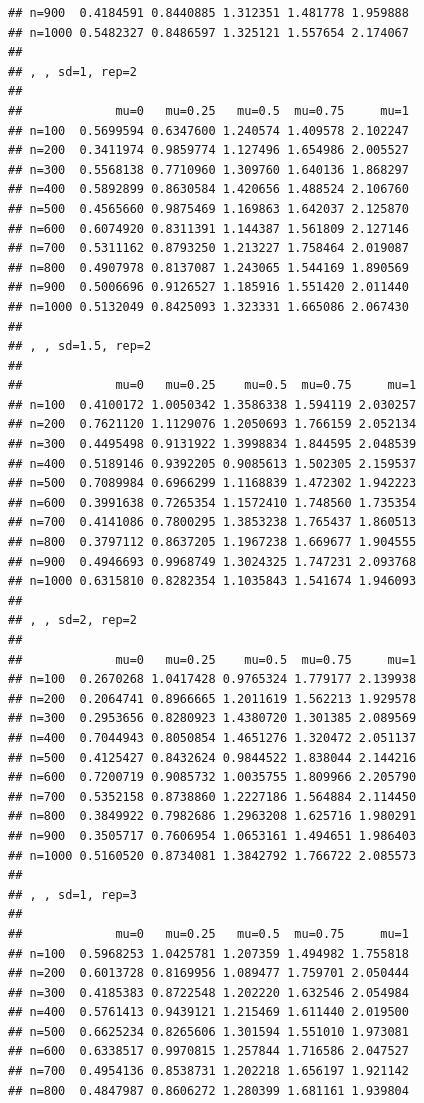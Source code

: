 \documentclass[11pt,a4paper]{article}
\begin{document}
\begin{verbatim}
## n=900  0.4184591 0.8440885 1.312351 1.481778 1.959888
## n=1000 0.5482327 0.8486597 1.325121 1.557654 2.174067
## 
## , , sd=1, rep=2
## 
##             mu=0   mu=0.25   mu=0.5  mu=0.75     mu=1
## n=100  0.5699594 0.6347600 1.240574 1.409578 2.102247
## n=200  0.3411974 0.9859774 1.127496 1.654986 2.005527
## n=300  0.5568138 0.7710960 1.309760 1.640136 1.868297
## n=400  0.5892899 0.8630584 1.420656 1.488524 2.106760
## n=500  0.4565660 0.9875469 1.169863 1.642037 2.125870
## n=600  0.6074920 0.8311391 1.144387 1.561809 2.127146
## n=700  0.5311162 0.8793250 1.213227 1.758464 2.019087
## n=800  0.4907978 0.8137087 1.243065 1.544169 1.890569
## n=900  0.5006696 0.9126527 1.185916 1.551420 2.011440
## n=1000 0.5132049 0.8425093 1.323331 1.665086 2.067430
## 
## , , sd=1.5, rep=2
## 
##             mu=0   mu=0.25    mu=0.5  mu=0.75     mu=1
## n=100  0.4100172 1.0050342 1.3586338 1.594119 2.030257
## n=200  0.7621120 1.1129076 1.2050693 1.766159 2.052134
## n=300  0.4495498 0.9131922 1.3998834 1.844595 2.048539
## n=400  0.5189146 0.9392205 0.9085613 1.502305 2.159537
## n=500  0.7089984 0.6966299 1.1168839 1.472302 1.942223
## n=600  0.3991638 0.7265354 1.1572410 1.748560 1.735354
## n=700  0.4141086 0.7800295 1.3853238 1.765437 1.860513
## n=800  0.3797112 0.8637205 1.1967238 1.669677 1.904555
## n=900  0.4946693 0.9968749 1.3024325 1.747231 2.093768
## n=1000 0.6315810 0.8282354 1.1035843 1.541674 1.946093
## 
## , , sd=2, rep=2
## 
##             mu=0   mu=0.25    mu=0.5  mu=0.75     mu=1
## n=100  0.2670268 1.0417428 0.9765324 1.779177 2.139938
## n=200  0.2064741 0.8966665 1.2011619 1.562213 1.929578
## n=300  0.2953656 0.8280923 1.4380720 1.301385 2.089569
## n=400  0.7044943 0.8050854 1.4651276 1.320472 2.051137
## n=500  0.4125427 0.8432624 0.9844522 1.838044 2.144216
## n=600  0.7200719 0.9085732 1.0035755 1.809966 2.205790
## n=700  0.5352158 0.8738860 1.2227186 1.564884 2.114450
## n=800  0.3849922 0.7982686 1.2963208 1.625716 1.980291
## n=900  0.3505717 0.7606954 1.0653161 1.494651 1.986403
## n=1000 0.5160520 0.8734081 1.3842792 1.766722 2.085573
## 
## , , sd=1, rep=3
## 
##             mu=0   mu=0.25   mu=0.5  mu=0.75     mu=1
## n=100  0.5968253 1.0425781 1.207359 1.494982 1.755818
## n=200  0.6013728 0.8169956 1.089477 1.759701 2.050444
## n=300  0.4185383 0.8722548 1.202220 1.632546 2.054984
## n=400  0.5761413 0.9439121 1.215469 1.611440 2.019500
## n=500  0.6625234 0.8265606 1.301594 1.551010 1.973081
## n=600  0.6338517 0.9970815 1.257844 1.716586 2.047527
## n=700  0.4954136 0.8538731 1.202218 1.656197 1.921142
## n=800  0.4847987 0.8606272 1.280399 1.681161 1.939804

\end{verbatim}
\end{document}
